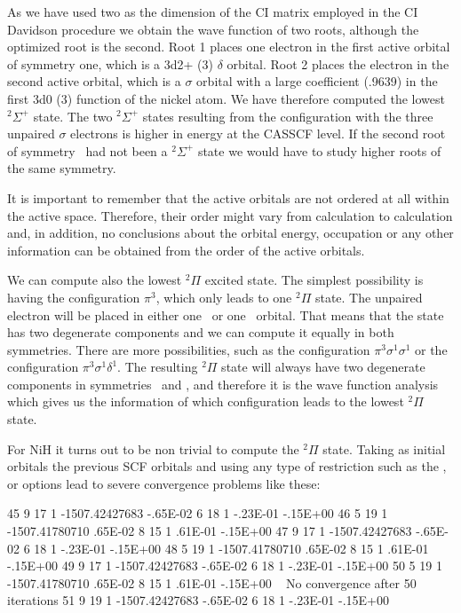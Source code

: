 As we have used two as the dimension of the CI matrix employed in the CI Davidson
procedure we obtain the wave function of two roots, although the optimized 
root is the second. Root 1 places one electron in the first active orbital
of symmetry one, which is a 3d2+ (3\dxtyt) $\delta$ orbital. Root 2 places
the electron in the second active orbital, which is a $\sigma$ orbital with a
large coefficient (.9639) in the first 3d0 (3\dzt) function of the nickel
atom. We have therefore computed the lowest $^2\Sigma^+$ state. The two $^2\Sigma^+$ states
resulting from the configuration with the three unpaired $\sigma$ electrons
is higher in energy at the CASSCF level. If the second root of symmetry \ao\
had not been a $^2\Sigma^+$ state we would have to study higher roots of the
same symmetry.


It is important to remember that the active orbitals are not ordered at all
within the active space. Therefore, their order might vary from calculation
to calculation and, in addition, no conclusions about the orbital energy,
occupation or any other information can be obtained from the
order of the active orbitals.

We can compute also the lowest $^2\Pi$ excited state. 
The simplest possibility is having the configuration $\pi^3$,
which only leads to one $^2\Pi$ state. The unpaired electron
will be placed in either one \bo\ or one \bt\ orbital. That means
that the state has two degenerate components and we can compute it 
equally in both symmetries. There are more possibilities, such as the
configuration $\pi^3\sigma^1\sigma^1$ or the configuration $\pi^3\sigma^1\delta^1$.
The resulting $^2\Pi$ state will always have two degenerate
components in symmetries
\bo\ and \bt, and therefore it is the wave function analysis which 
gives us the information of which configuration leads to
the lowest $^2\Pi$ state. 


For NiH it turns out to be non trivial to compute the $^2\Pi$ state.
Taking as initial orbitals
the previous SCF orbitals and using any type of restriction such as
the \keyword{CLEAnup}, \keyword{SUPSym} or \keyword{AVERage} options lead to 
severe convergence problems like these:

\begin{sourcelisting}
       45   9   17    1 -1507.42427683    -.65E-02   6  18 1  -.23E-01  -.15E+00  
       46   5   19    1 -1507.41780710     .65E-02   8  15 1   .61E-01  -.15E+00 
       47   9   17    1 -1507.42427683    -.65E-02   6  18 1  -.23E-01  -.15E+00 
       48   5   19    1 -1507.41780710     .65E-02   8  15 1   .61E-01  -.15E+00 
       49   9   17    1 -1507.42427683    -.65E-02   6  18 1  -.23E-01  -.15E+00 
       50   5   19    1 -1507.41780710     .65E-02   8  15 1   .61E-01  -.15E+00 
~
      No convergence after  50 iterations
       51   9   19    1 -1507.42427683    -.65E-02   6  18 1  -.23E-01  -.15E+00 
\end{sourcelisting}

